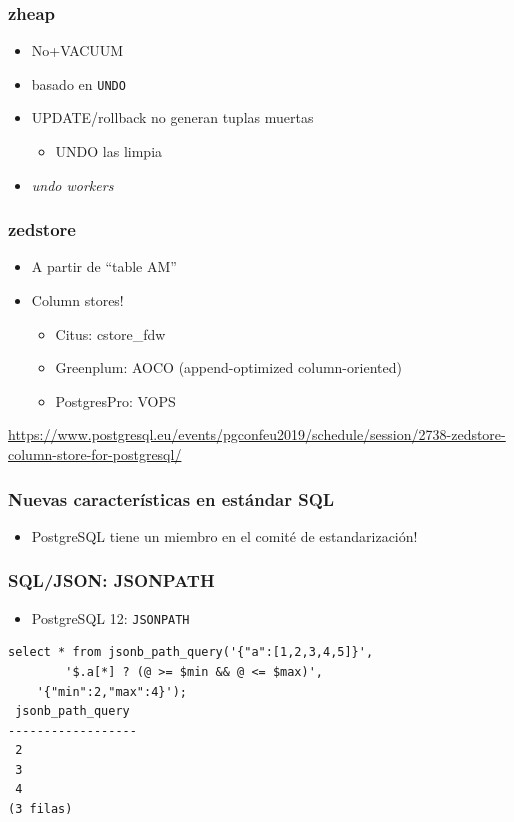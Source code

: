 \begin{frame}
\frametitle{zheap}

\begin{itemize}
\item No+VACUUM
\item basado en \texttt{UNDO}
\item UPDATE/rollback no generan tuplas muertas
\begin{itemize} \item UNDO las limpia \end{itemize}
\item \textit{undo workers}
\end{itemize}

\end{frame}

\begin{frame}
\frametitle{zedstore}

\begin{itemize}
\item A partir de ``table AM''
\item Column stores!
\begin{itemize}
\item Citus: cstore\_fdw
\item Greenplum: AOCO (append-optimized column-oriented)
\item PostgresPro: VOPS
\end{itemize}
\end{itemize}

\footnotesize
\url{https://www.postgresql.eu/events/pgconfeu2019/schedule/session/2738-zedstore-column-store-for-postgresql/}
\end{frame}

\begin{frame}
\frametitle{Nuevas características en estándar SQL}

\begin{itemize}
\item PostgreSQL tiene un miembro en el comité de estandarización!
\end{itemize}
\end{frame}

\begin{frame}[fragile]
\frametitle{SQL/JSON: JSONPATH}

\begin{itemize}
\item PostgreSQL 12: \texttt{JSONPATH}
\end{itemize}
\begin{verbatim}
select * from jsonb_path_query('{"a":[1,2,3,4,5]}',
        '$.a[*] ? (@ >= $min && @ <= $max)',
	'{"min":2,"max":4}');
 jsonb_path_query 
------------------
 2
 3
 4
(3 filas)
\end{verbatim}
\end{frame}

